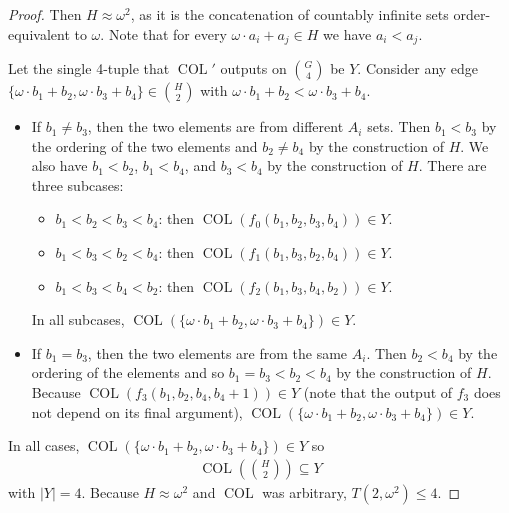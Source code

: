 \documentclass[10pt,a4paper]{article}
\newcommand{\om}{\omega}
\newcommand{\oequiv}{\approx}
\newcommand{\COL}{\operatorname{COL}}
\newcommand{\commonconst}{a}
\newcommand{\rareconst}{b}
\theoremstyle{plain}
\theoremstyle{definition}
\begin{document}
\begin{proof}
Then $H \oequiv \om^2$, as it is the concatenation of countably infinite sets order-equivalent to $\om$. Note that for every $\om \cdot \commonconst_i + \commonconst_j \in H$ we have $\commonconst_i < \commonconst_j$.

Let the single 4-tuple that $\COL'$ outputs on $\binom{G}{4}$ be $Y.$ Consider any edge $\{\om \cdot \rareconst_1 + \rareconst_2, \om \cdot \rareconst_3 + \rareconst_4\} \in \binom{H}{2}$ with $\om \cdot \rareconst_1 + \rareconst_2 < \om \cdot \rareconst_3 + \rareconst_4$. \begin{itemize}
\item If $\rareconst_1 \neq \rareconst_3$, then the two elements are from different $A_i$ sets. Then $\rareconst_1 < \rareconst_3$ by the ordering of the two elements and $\rareconst_2 \neq \rareconst_4$ by the construction of $H$. 
We also have $\rareconst_1 < \rareconst_2$, $\rareconst_1 < \rareconst_4$, and $\rareconst_3 < \rareconst_4$ by the construction of $H$.
There are three subcases: \begin{itemize}
    \item $\rareconst_1<\rareconst_2<\rareconst_3<\rareconst_4$: then $\COL(f_0(\rareconst_1,\rareconst_2,\rareconst_3,\rareconst_4)) \in Y.$
    \item $\rareconst_1<\rareconst_3<\rareconst_2<\rareconst_4$: then $\COL(f_1(\rareconst_1,\rareconst_3,\rareconst_2,\rareconst_4)) \in Y.$
    \item $\rareconst_1<\rareconst_3<\rareconst_4<\rareconst_2$: then $\COL(f_2(\rareconst_1,\rareconst_3,\rareconst_4,\rareconst_2)) \in Y.$
\end{itemize}
In all subcases, $\COL(\{\om \cdot \rareconst_1 + \rareconst_2, \om \cdot \rareconst_3 + \rareconst_4\}) \in Y.$
\item If $\rareconst_1 = \rareconst_3$, then the two elements are from the same $A_i.$ Then $\rareconst_2 < \rareconst_4$ by the ordering of the elements and so $\rareconst_1=\rareconst_3<\rareconst_2<\rareconst_4$ by the construction of $H$. Because $\COL(f_3(\rareconst_1,\rareconst_2,\rareconst_4,\rareconst_4+1)) \in Y$ (note that the output of $f_3$ does not depend on its final argument), $\COL(\{\om \cdot \rareconst_1 + \rareconst_2, \om \cdot \rareconst_3 + \rareconst_4\}) \in Y$.
\end{itemize}
In all cases, $\COL(\{\om \cdot \rareconst_1 + \rareconst_2, \om \cdot \rareconst_3 + \rareconst_4\}) \in Y$ so \begin{align*}
\COL\left(\binom{H}{2}\right) \subseteq Y
\end{align*} with $|Y|=4$. Because $H \oequiv \om^2$ and $\COL$ was arbitrary, $T\left(2, \om^2\right) \leq 4$.


\end{proof}
\end{document}
